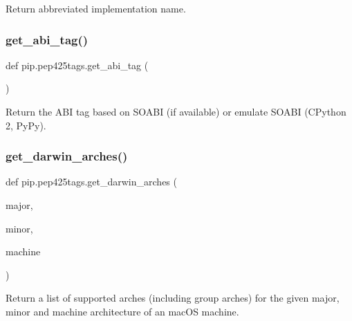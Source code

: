 \begin{DoxyVerb}Return abbreviated implementation name.\end{DoxyVerb}
 \mbox{\label{namespacepip_1_1pep425tags_a9eb1e9596e7d77559943f16182ba08d5}} 
\subsubsection{\texorpdfstring{get\+\_\+abi\+\_\+tag()}{get\_abi\_tag()}}
{\footnotesize\ttfamily def pip.\+pep425tags.\+get\+\_\+abi\+\_\+tag (\begin{DoxyParamCaption}{ }\end{DoxyParamCaption})}

\begin{DoxyVerb}Return the ABI tag based on SOABI (if available) or emulate SOABI
(CPython 2, PyPy).\end{DoxyVerb}
 \mbox{\label{namespacepip_1_1pep425tags_adf0a925b9fa10bdc4ab0735112f3f679}} 
\subsubsection{\texorpdfstring{get\+\_\+darwin\+\_\+arches()}{get\_darwin\_arches()}}
{\footnotesize\ttfamily def pip.\+pep425tags.\+get\+\_\+darwin\+\_\+arches (\begin{DoxyParamCaption}\item[{}]{major,  }\item[{}]{minor,  }\item[{}]{machine }\end{DoxyParamCaption})}

\begin{DoxyVerb}Return a list of supported arches (including group arches) for
the given major, minor and machine architecture of an macOS machine.
\end{DoxyVerb}
 \mbox{\label{namespacepip_1_1pep425tags_a6c08127e7266394e98a9a0d3ae411e37}} 
